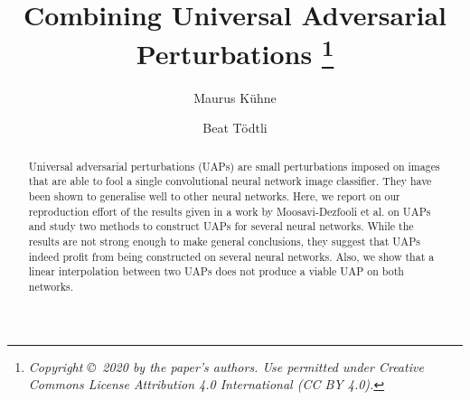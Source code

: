 \documentclass[runningheads]{llncs}
\begin{document}
%
\title{Combining Universal Adversarial Perturbations
\thanks{\it Copyright \copyright\, 2020 by the paper’s authors. Use permitted under Creative Commons License Attribution 4.0 International (CC BY 4.0).}
}%
%
%
\author{Maurus K\"uhne \and
Beat Tödtli} %
%
%
%
\maketitle              %
%
\begin{abstract}
Universal adversarial perturbations (UAPs) are small perturbations imposed on images that are able to fool a single convolutional neural network image classifier. They have been shown to generalise well to other neural networks. Here, we report on our reproduction effort of the results given in a work by Moosavi-Dezfooli et al. on UAPs and study two methods to construct UAPs for several neural networks. While the results are not strong enough to make general conclusions, they suggest that UAPs indeed profit from being constructed on several neural networks. Also, we show that a linear interpolation between two UAPs does not produce a viable UAP on both networks.
\end{abstract}
%
%
%
\end{document}
